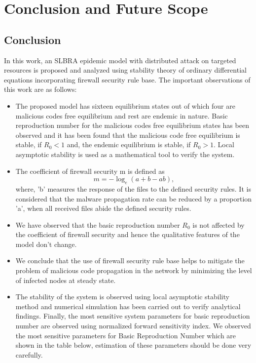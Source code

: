 \chapter{Conclusion and Future Scope}
\section{Conclusion}
In this work, an SLBRA epidemic model with distributed
attack on targeted resources is proposed and analyzed using stability theory of ordinary differential equations incorporating firewall security rule base. The important observations of this work are as follows:
\begin{itemize}
\item
The proposed model has sixteen equilibrium states out of which four are malicious codes free equilibrium and rest are endemic in nature. Basic reproduction number for
the malicious codes free equilibrium states has been observed and it has been found that the malicious code free equilibrium is stable, if $R_{0} < 1$ and, the endemic equilibrium is stable, if $R_{0} > 1$. Local
asymptotic stability is used as a mathematical tool to verify the system.
\item
The coefficient of firewall security m is defined as
          $$m=-{\log_e (a+b-ab)},$$
where, 'b' measures the response of the files to the defined security rules. It is considered that the malware propagation rate can be reduced by a proportion 'a', when all received files abide the defined security rules.

\item
We have observed that the basic reproduction number $R_{0}$ is not affected by the coefficient of firewall security and hence the qualitative features of the model don't change.

\item
We conclude that the use of firewall security rule base helps to mitigate
the problem of malicious code propagation in the network by minimizing the level of infected nodes at steady state.

\item
The stability of the system is observed using local asymptotic stability method and numerical simulation has been carried out to verify analytical findings. Finally, the most sensitive system parameters for basic reproduction number are observed using normalized forward sensitivity index. We observed the most sensitive parameters for Basic Reproduction Number which are shown in the table below, estimation of these parameters should be done very carefully.



\end{itemize}
